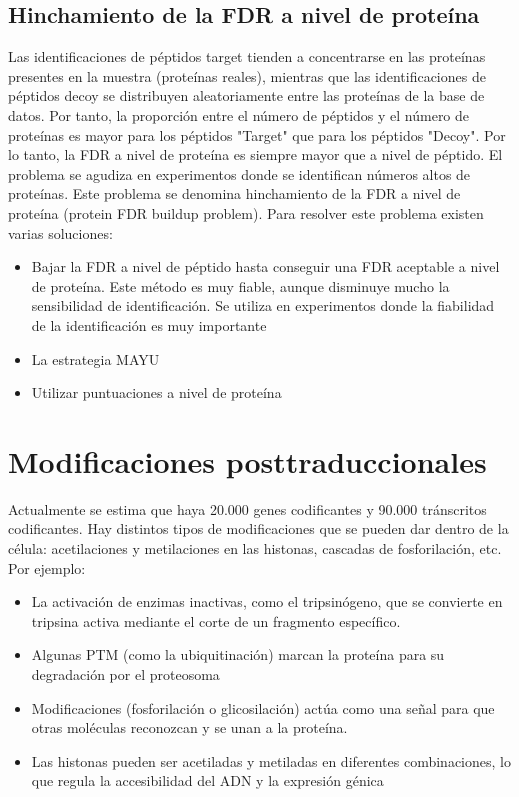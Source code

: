 \subsection{Hinchamiento de la FDR a nivel de proteína}
Las identificaciones de péptidos target tienden a concentrarse en las proteínas presentes en la muestra (proteínas reales), mientras que las identificaciones de péptidos decoy se distribuyen aleatoriamente entre las proteínas de la base de datos. Por tanto, la proporción entre el número de péptidos y el número de proteínas es mayor para los péptidos "Target" que para los péptidos "Decoy". Por lo tanto, la FDR a nivel de proteína es siempre mayor que a nivel de péptido. El problema se agudiza en experimentos donde se identifican números altos de proteínas. Este problema se denomina hinchamiento de la FDR a nivel de proteína (protein FDR buildup problem). Para resolver este problema existen varias soluciones:
\begin{itemize}
\item Bajar la FDR a nivel de péptido hasta conseguir una FDR aceptable a nivel de proteína. Este método es muy fiable, aunque disminuye mucho la sensibilidad de identificación. Se utiliza en experimentos donde la fiabilidad de la identificación es muy importante
\item La estrategia MAYU
\item Utilizar puntuaciones a nivel de proteína
\end{itemize}

\section{Modificaciones posttraduccionales}
Actualmente se estima que haya 20.000 genes codificantes y 90.000 tránscritos codificantes. Hay distintos tipos de modificaciones que se pueden dar dentro de la célula: acetilaciones y metilaciones en las histonas, cascadas de fosforilación, etc. Por ejemplo:
\begin{itemize}
\item La activación de enzimas inactivas, como el tripsinógeno, que se convierte en tripsina activa mediante el corte de un fragmento específico.
\item Algunas PTM (como la ubiquitinación) marcan la proteína para su degradación por el proteosoma
\item Modificaciones (fosforilación o glicosilación) actúa como una señal para que otras moléculas reconozcan y se unan a la proteína.
\item Las histonas pueden ser acetiladas y metiladas en diferentes combinaciones, lo que regula la accesibilidad del ADN y la expresión génica
\end{itemize}

